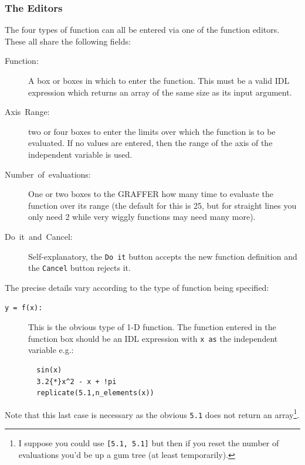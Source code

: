 \documentclass[11pt,twoside,english]{article}
\begin{document}
\subsubsection{The Editors }

The four types of function can all be entered via one of the function
editors. These all share the following fields:

\begin{description}
\item [Function:]A box or boxes in which to enter the function. This
  must be a valid IDL expression which returns an array of the same
  size as its input argument.
\item [Axis~Range:]two or four boxes to enter the limits over which the
  function is to be evaluated. If no values are entered, then the range
  of the axis of the independent variable is used.
\item [Number~of~evaluations:]One or two boxes to the GRAFFER how many
  time to evaluate the function over its range (the default for this is
  25, but for straight lines you only need 2 while very wiggly
  functions may need many more).
\item [Do~it~\textmd{and}~Cancel:]Self-explanatory, the \texttt{Do it}
  button accepts the new function definition and the \texttt{Cancel}
  button rejects it.
\end{description}
The precise details vary according to the type of function being
specified:

\begin{description}
\item [\texttt{y~=~f(x):}]This is the obvious type of 1-D function. The
  function entered in the function box should be an IDL expression with
  \texttt{x as} the independent variable e.g.:

\begin{verbatim}
  sin(x)
  3.2{*}x^2 - x + !pi
  replicate(5.1,n_elements(x))
\end{verbatim}
\end{description}
Note that this last case is necessary as the obvious \texttt{5.1} does
not return an array\footnote{I suppose you could use \texttt{{[}5.1,
    5.1{]}} but then if you reset the number of evaluations you'd be up
  a gum tree (at least temporarily).}.
\end{document}
